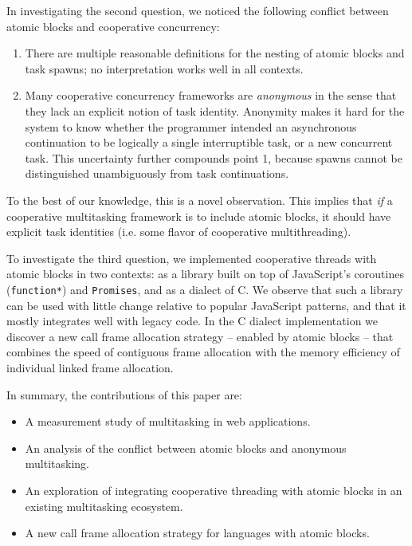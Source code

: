 \documentclass[acmsmall,anonymous,review]{acmart}\settopmatter{printfolios=true,printccs=false,printacmref=false}
\begin{document}

In investigating the second question, we noticed the following conflict between atomic blocks and cooperative concurrency:
\begin{enumerate}
\item There are multiple reasonable definitions for the nesting of atomic blocks and task spawns; no interpretation works well in all contexts.
\item Many cooperative concurrency frameworks are \emph{anonymous} in the sense that they lack an explicit notion of task identity.
  Anonymity makes it hard for the system to know whether the programmer intended an asynchronous continuation to be logically a single interruptible task, or a new concurrent task.
  This uncertainty further compounds point 1, because spawns cannot be distinguished unambiguously from task continuations.
\end{enumerate}
To the best of our knowledge, this is a novel observation.
This implies that \emph{if} a cooperative multitasking framework is to include atomic blocks, it should have explicit task identities (i.e. some flavor of cooperative multithreading).

To investigate the third question, we implemented cooperative threads with atomic blocks in two contexts: as a library built on top of JavaScript's coroutines (\texttt{function*}) and \texttt{Promises}, and as a dialect of C.
We observe that such a library can be used with little change relative to popular JavaScript patterns, and that it mostly integrates well with legacy code.
In the C dialect implementation we discover a new call frame allocation strategy -- enabled by atomic blocks -- that combines the speed of contiguous frame allocation with the memory efficiency of individual linked frame allocation.

In summary, the contributions of this paper are:
\begin{itemize}
\item A measurement study of multitasking in web applications.
\item An analysis of the conflict between atomic blocks and anonymous multitasking.
\item An exploration of integrating cooperative threading with atomic blocks in an existing multitasking ecosystem.
\item A new call frame allocation strategy for languages with atomic blocks.
\end{itemize}
\end{document}
